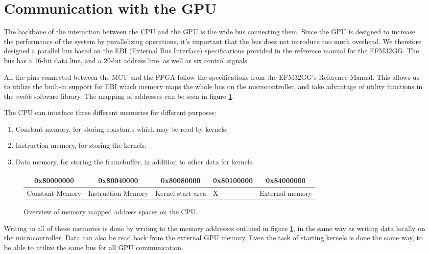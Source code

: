 \documentclass[../main/report.tex]{subfiles}
\begin{document}
\section{Communication with the GPU}

The backbone of the interaction between the CPU and the GPU is the wide bus connecting them.
Since the GPU is designed to increase the performance of the system by parallelizing operations,
it's important that the bus does not introduce too much overhead.
We therefore designed a parallel bus based on the EBI (External Bus Interface) specifications provided
in the reference manual for the EFM32GG\cite[p.175]{efm32gg}.
The bus has a 16-bit data line, and a 20-bit address line, as well as six control signals.

All the pins connected between the MCU and the FPGA follow the specifications from the EFM32GG's Reference Manual\cite[p.175]{efm32gg}.
This allows us to utilize the built-in support for EBI which memory maps the whole bus on the microcontroller, and take advantage of utility functions in the \emph{emlib} software library\cite{emlib}.
The mapping of addresses can be seen in figure \ref{fig:memory_map}.

The CPU can interface three different memories for different purposes:

\begin{enumerate}
    \item Constant memory, for storing constants which may be read by kernels.
    \item Instruction memory, for storing the kernels.
    \item Data memory, for storing the framebuffer, in addition to other data for kernels.
\end{enumerate}

\begin{figure}[H]
    \centering
    \begin{tabularx}{\textwidth}{|X|X|X|X|X|}
    \multicolumn{1}{c}{0x80000000} & \multicolumn{1}{c}{0x80040000} & \multicolumn{1}{c}{0x80080000} & \multicolumn{1}{c}{0x80100000} & \multicolumn{1}{c}{0x84000000} \\ \hline
    Constant Memory & Instruction Memory & Kernel start area & X & External memory \\ \hline
    \end{tabularx}
    \caption{Overview of memory mapped address spaces on the CPU.}
    \label{fig:memory_map}
\end{figure}

Writing to all of these memories is done by writing to the memory addresses
outlined in figure \ref{fig:memory_map},
in the same way as writing data locally on the microcontroller.
Data can also be read back from the external GPU memory.
Even the task of starting kernels is done the same way, to be able to utilize the same bus for all GPU communication.
\end{document}
